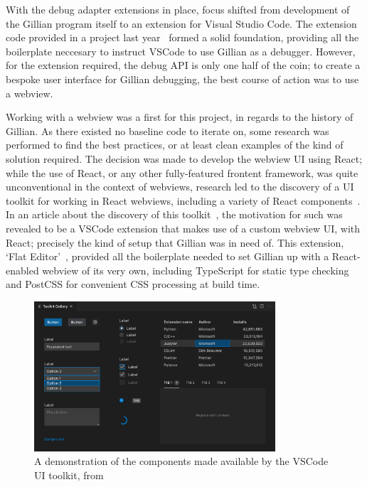With the debug adapter extensions in place, focus shifted from development of
the Gillian program itself to an extension for Visual Studio Code. The extension
code provided in a project last year~\cite{gillian-debugging-2021} formed a
solid foundation, providing all the boilerplate neccesary to instruct VSCode to
use Gillian as a debugger. However, for the extension required, the debug API
is only one half of the coin; to create a bespoke user interface for Gillian
debugging, the best course of action was to use a webview.

Working with a webview was a first for this project, in regards to the history
of Gillian. As there existed no baseline code to iterate on, some research was
performed to find the best practices, or at least clean examples of the kind
of solution required. The decision was made to develop the webview UI using
React; while the use of React, or any other fully-featured frontent framework,
was quite unconventional in the context of webviews, research led to the
discovery of a UI toolkit for working in React webviews, including a variety
of React components~\cite{vscode-ui-toolkit}. In an article about the discovery
of this toolkit~\cite{vscode-ui-toolkit-article}, the motivation for such was
revealed to be a VSCode extension that makes use of a custom webview UI, with
React; precisely the kind of setup that Gillian was in need of. This extension,
`Flat Editor'~\cite{flat-editor}, provided all the boilerplate needed to set
Gillian up with a React-enabled webview of its very own, including TypeScript
for static type checking and PostCSS for convenient CSS processing at build
time.

\begin{figure}
  \center{}
  \includegraphics[width=0.8\textwidth]{img/vscode-ui-toolkit-demo.png}
  \caption{
    A demonstration of the components made available by the VSCode UI toolkit,
    from~\cite{vscode-ui-toolkit}}%
  \label{fig:vscode-ui-toolkit-demo}
\end{figure}

